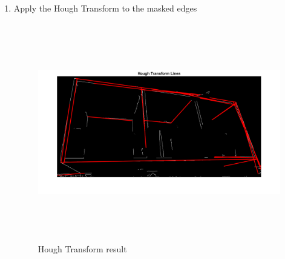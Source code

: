 \begin{enumerate}
    \item Apply the Hough Transform to the masked edges

                    \begin{figure}[H]
    \centering
    \includegraphics[height=9.5cm, width=\textwidth, keepaspectratio]{Report/Images/Features/Lines/HoughLines.png}
    \caption{\label{fig:lines:lines}Hough Transform result}
    \end{figure}


    
\end{enumerate}

